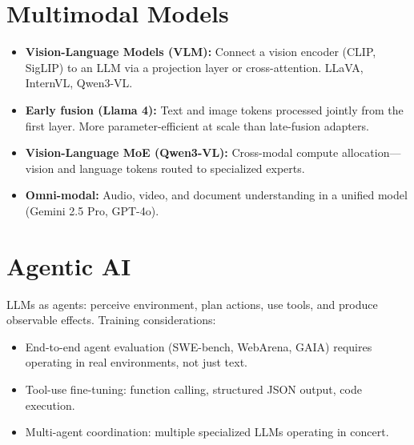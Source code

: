 \section{Multimodal Models}

\begin{itemize}
  \item \textbf{Vision-Language Models (VLM):} Connect a vision encoder (CLIP, SigLIP) to an LLM via a projection layer or cross-attention. LLaVA, InternVL, Qwen3-VL.
  \item \textbf{Early fusion (Llama 4):} Text and image tokens processed jointly from the first layer. More parameter-efficient at scale than late-fusion adapters.
  \item \textbf{Vision-Language MoE (Qwen3-VL):} Cross-modal compute allocation---vision and language tokens routed to specialized experts.
  \item \textbf{Omni-modal:} Audio, video, and document understanding in a unified model (Gemini 2.5 Pro, GPT-4o).
\end{itemize}

\section{Agentic AI}

LLMs as agents: perceive environment, plan actions, use tools, and produce observable effects. Training considerations:
\begin{itemize}
  \item End-to-end agent evaluation (SWE-bench, WebArena, GAIA) requires operating in real environments, not just text.
  \item Tool-use fine-tuning: function calling, structured JSON output, code execution.
  \item Multi-agent coordination: multiple specialized LLMs operating in concert.
\end{itemize}
